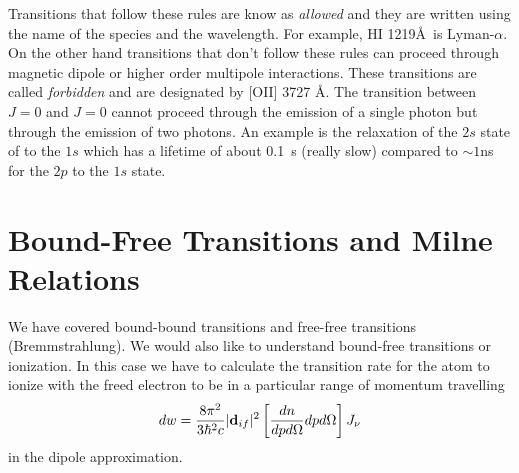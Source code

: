 Transitions that follow these rules are know as {\em allowed} and they
are written using the name of the species and the wavelength.  For
example, HI 1219\AA\ is Lyman-$\alpha$.  On the other hand transitions
that don't follow these rules can proceed through magnetic dipole or
higher order multipole interactions.  These transitions are called
{\em forbidden} and are designated by [OII] 3727 \AA.   The transition
between $J=0$ and $J=0$ cannot proceed through the emission of a
single photon but through the emission of two photons.  An example is
the relaxation of the $2s$ state of to the $1s$ which has a lifetime
of about 0.1~s (really slow) compared to $\sim 1$ns for the $2p$ to
the $1s$ state. 

\section{Bound-Free Transitions and Milne Relations}
\label{sec:bound-free-trans}

We have covered bound-bound transitions and free-free transitions
(Bremmstrahlung). We would also like to understand bound-free
transitions or ionization.  In this case we have to calculate the
transition rate for the atom to ionize with the freed electron to be
in a particular range of momentum travelling
\begin{equation}
dw = \frac{8\pi^2}{3 \hbar^2 c} | {\bf d}_{if} |^2 \left [
  \frac{dn}{dp d\Omega} dp d\Omega \right ] J_\nu
\label{eq:541}
\end{equation}
in the dipole approximation.

